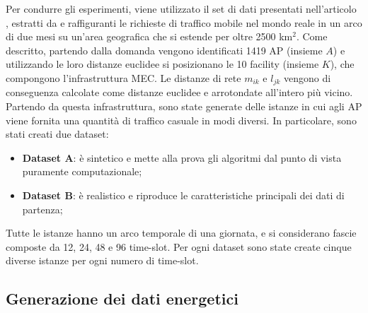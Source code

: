 Per condurre gli esperimenti, viene utilizzato il set di dati presentati nell'articolo \cite{assignment-patterns}, estratti da \cite{Barlacchi2015} e raffiguranti le richieste di traffico mobile nel mondo reale in un arco di due mesi su un'area geografica che si estende per oltre 2500 km$^2$. Come descritto, partendo dalla domanda vengono identificati 1419 AP (insieme $A$) e utilizzando le loro distanze euclidee si posizionano le 10 facility (insieme $K$), che compongono l'infrastruttura MEC. Le distanze di rete $m_{ik}$ e $l_{jk}$ vengono di conseguenza calcolate come distanze euclidee e arrotondate all'intero più vicino. Partendo da questa infrastruttura, sono state generate delle istanze in cui agli AP viene fornita una quantità di traffico casuale in modi diversi. 
In particolare, sono stati creati due dataset:
\begin{itemize}
    \item \textbf{Dataset A}: è sintetico e mette alla prova gli algoritmi dal punto di vista puramente computazionale;
    \item \textbf{Dataset B}: è realistico e riproduce le caratteristiche principali dei dati di partenza;
\end{itemize}
Tutte le istanze hanno un arco temporale di una giornata, e si considerano fascie composte da 12, 24, 48 e 96 time-slot. Per ogni dataset sono state create cinque diverse istanze per ogni numero di time-slot.


\subsection{Generazione dei dati energetici}

